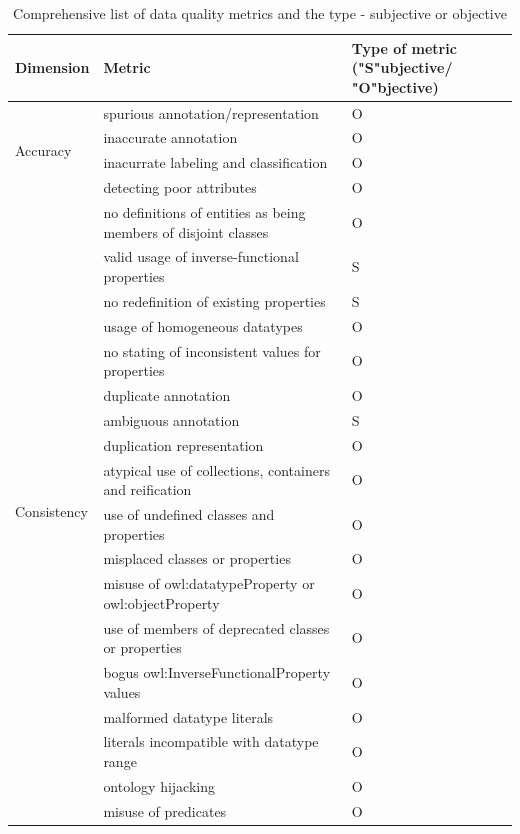 \onecolumn
\begin{longtable}{ | p{3cm} | p{10cm} | >{\centering\arraybackslash}p{2cm}| }
\caption{Comprehensive list of data quality metrics and the type - subjective or objective}
\label{metrics} \\
\hline
\textbf{Dimension} & \textbf{Metric} & \textbf{Type of metric ("S"ubjective/ "O"bjective)} \\
\hline
\multirow{4}{*}{Accuracy} & spurious annotation/representation & O \\
\cline{2-3}
& inaccurate annotation & O \\
\cline{2-3}
& inacurrate labeling and classification & O \\
\cline{2-3}
& detecting poor attributes & O \\
\hline
\multirow{19}{*}{Consistency} & no definitions of entities as being members of disjoint classes & O\\
\cline{2-3}
& valid usage of inverse-functional properties & S \\
\cline{2-3}
& no redefinition of existing properties & S\\
\cline{2-3}
& usage of homogeneous datatypes & O\\
\cline{2-3}
& no stating of inconsistent values for properties & O\\
\cline{2-3}
& duplicate annotation & O\\
\cline{2-3}
& ambiguous annotation & S\\
\cline{2-3}
& duplication representation & O\\
\cline{2-3}
& atypical use of collections, containers and reification & O\\
\cline{2-3}
& use of undefined classes and properties & O\\
\cline{2-3}
& misplaced classes or properties & O\\
\cline{2-3}
& misuse of owl:datatypeProperty or owl:objectProperty & O\\
\cline{2-3}
& use of members of deprecated classes or properties & O\\
\cline{2-3}
& bogus owl:InverseFunctionalProperty values & O\\
\cline{2-3}
& malformed datatype literals & O\\
\cline{2-3}
& literals incompatible with datatype range & O\\
\cline{2-3}
& ontology hijacking & O\\
\cline{2-3}
& misuse of predicates & O\\

\end{longtable}
